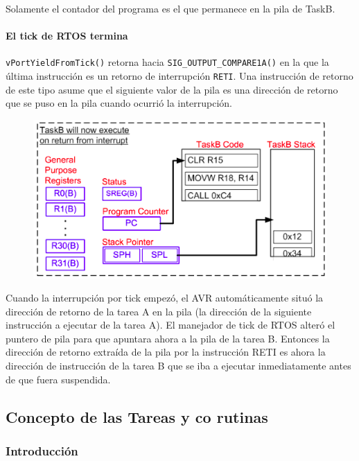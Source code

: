Solamente el contador del programa es el que permanece en la pila de TaskB.

\paragraph{El tick de RTOS termina}

\texttt{vPortYieldFromTick()} retorna hacia \texttt{SIG\_OUTPUT\_COMPARE1A()} en la que la última instrucción es un retorno de interrupción \texttt{RETI}. Una instrucción de retorno de este tipo asume que el siguiente valor de la pila es una dirección de retorno que se puso en la pila cuando ocurrió la interrupción.

\begin{figure}[H]
    \centering
    \includegraphics[scale=0.7]{RTOS/f10.PNG}
\end{figure}

Cuando la interrupción por tick empezó, el AVR automáticamente situó la dirección de retorno de la tarea A en la pila (la dirección de la siguiente instrucción a ejecutar de la tarea A). El manejador de tick de RTOS alteró el puntero de pila para que apuntara ahora a la pila de la tarea B. Entonces la dirección de retorno extraída de la pila por la instrucción RETI es ahora la dirección de instrucción de la tarea B que se iba a ejecutar inmediatamente antes de que fuera suspendida.  

\subsection{Concepto de las Tareas y co rutinas}

    \subsubsection{Introducción}
    
